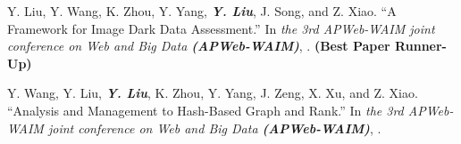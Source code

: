 \documentclass[a4paper,10pt,oneside]{article}
\begin{document}
\begin{body}

\NumberedItem{[6]}
Y. Liu, Y. Wang, K. Zhou, Y. Yang, \textbf{\textit{Y. Liu}}, J. Song, and Z. Xiao.
``A Framework for Image Dark Data Assessment.''
In \textit{the 3rd APWeb-WAIM joint conference on Web and Big Data \textbf{(APWeb-WAIM)}}, %
. \textbf{(Best Paper Runner-Up)}


\NumberedItem{[7]}
Y. Wang, Y. Liu, \textbf{\textit{Y. Liu}}, K. Zhou, Y. Yang, J. Zeng, X. Xu, and Z. Xiao.
``Analysis and Management to Hash-Based Graph and Rank.''
In \textit{the 3rd APWeb-WAIM joint conference on Web and Big Data \textbf{(APWeb-WAIM)}}, %
. 










\end{body}
\end{document}
